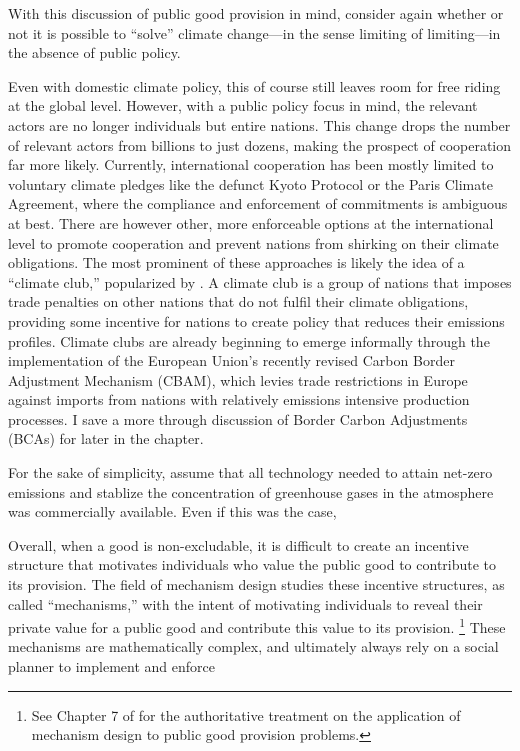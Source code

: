 With this discussion of public good provision in mind, consider again whether or not it is possible to ``solve'' climate change---in the sense limiting of limiting---in the absence of public policy. 


Even with domestic climate policy, this of course still leaves room for free riding at the global level. However, with a public policy focus in mind, the relevant actors are no longer individuals but entire nations. This change drops the number of relevant actors from billions to just dozens, making the prospect of cooperation far more likely. Currently, international cooperation has been mostly limited to voluntary climate pledges like the defunct Kyoto Protocol or the Paris Climate Agreement, where the compliance and enforcement of commitments is ambiguous at best. There are however other, more enforceable options at the international level to promote cooperation and prevent nations from shirking on their climate obligations. The most prominent of these approaches is likely the idea of a ``climate club,'' popularized by \cite{nordhaus2015climate}. A climate club is a group of nations that imposes trade penalties on other nations that do not fulfil their climate obligations, providing some incentive for nations to create policy that reduces their emissions profiles. Climate clubs are already beginning to emerge informally through the implementation of the European Union's recently revised Carbon Border Adjustment Mechanism (CBAM), which levies trade restrictions in Europe against imports from nations with relatively emissions intensive production processes. I save a more through discussion of Border Carbon Adjustments (BCAs) for later in the chapter. 


For the sake of simplicity, assume that all technology needed to attain net-zero emissions and stablize the concentration of greenhouse gases in the atmosphere was commercially available. Even if this was the case, 



Overall, when a good is non-excludable, it is difficult to create an incentive structure that motivates individuals who value the public good to contribute to its provision. The field of mechanism design studies these incentive structures, as called ``mechanisms,''  with the intent of motivating individuals to reveal their private value for a public good and contribute this value to its provision. \footnote{See Chapter 7 of \cite{fudenberg1991game} for the authoritative treatment on the application of mechanism design to public good provision problems.} These mechanisms are mathematically complex, and ultimately always rely on a social planner to implement and enforce


